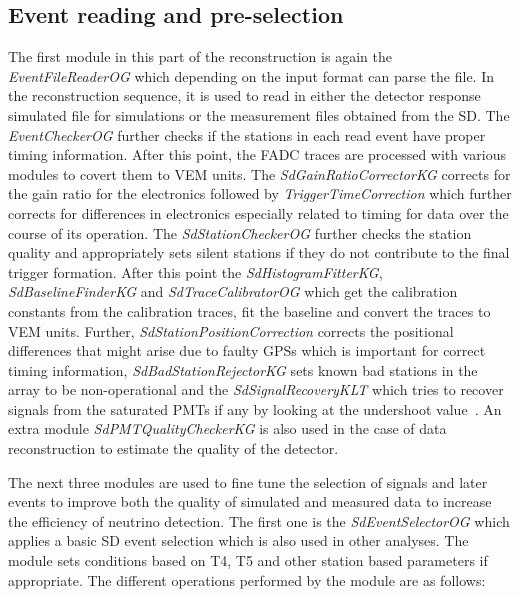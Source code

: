 \subsection{Event reading and pre-selection}
\label{subsec:reco_presel}

The first module in this part of the reconstruction is again the \textit{EventFileReaderOG} which depending on the input format can parse the file. In the reconstruction sequence, it is used to read in either the detector response simulated file for simulations or the measurement files obtained from the SD. The \textit{EventCheckerOG} further checks if the stations in each read event have proper timing information. After this point, the FADC traces are processed with various modules to covert them to VEM units. The \textit{SdGainRatioCorrectorKG} corrects for the gain ratio for the electronics followed by \textit{TriggerTimeCorrection} which further corrects for differences in electronics especially related to timing for data over the course of its operation. The \textit{SdStationCheckerOG} further checks the station quality and appropriately sets silent stations if they do not contribute to the final trigger formation. After this point the \textit{SdHistogramFitterKG}, \textit{SdBaselineFinderKG} and \textit{SdTraceCalibratorOG} which get the calibration constants from the calibration traces, fit the baseline and convert the traces to VEM units. Further, \textit{SdStationPositionCorrection} corrects the positional differences that might arise due to faulty GPSs which is important for correct timing information, \textit{SdBadStationRejectorKG} sets known bad stations in the array to be non-operational and the \textit{SdSignalRecoveryKLT} which tries to recover signals from the saturated PMTs if any by looking at the undershoot value~\cite{Veberic:2013suc,PierreAuger:2020yab}. An extra module \textit{SdPMTQualityCheckerKG} is also used in the case of data reconstruction to estimate the quality of the detector.

The next three modules are used to fine tune the selection of signals and later events to improve both the quality of simulated and measured data to increase the efficiency of neutrino detection. The first one is the \textit{SdEventSelectorOG} which applies a basic SD event selection which is also used in other analyses. The module sets conditions based on T4, T5 and other station based parameters if appropriate. The different operations performed by the module are as follows:

